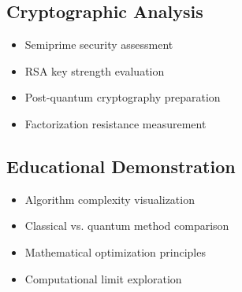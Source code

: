 	\subsection{Cryptographic Analysis}
	\begin{itemize}
		\item Semiprime security assessment
		\item RSA key strength evaluation
		\item Post-quantum cryptography preparation
		\item Factorization resistance measurement
	\end{itemize}
	
	\subsection{Educational Demonstration}
	\begin{itemize}
		\item Algorithm complexity visualization
		\item Classical vs. quantum method comparison
		\item Mathematical optimization principles
		\item Computational limit exploration
	\end{itemize}
	